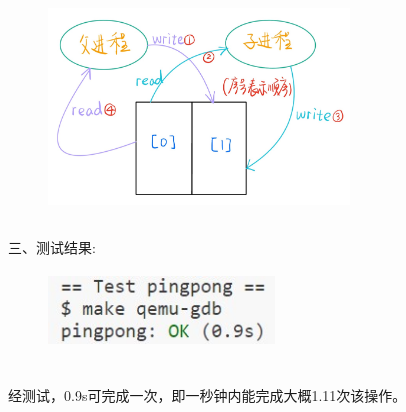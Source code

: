 \documentclass[12pt]{article}
\begin{document}
\begin{figure}[htbp]
    \centering
    \includegraphics*[height=6cm,width=8cm]{HW1-1.jpg}\\
\end{figure}
\vspace*{1cm}
\begin{Large}
    \noindent 三、测试结果:
\end{Large}
\begin{figure}[htbp]
    \centering
    \includegraphics[height=2cm,width=6cm]{HW1.jpg}
\end{figure}\\
\noindent 经测试，0.9s可完成一次，即一秒钟内能完成大概1.11次该操作。
\end{document}
